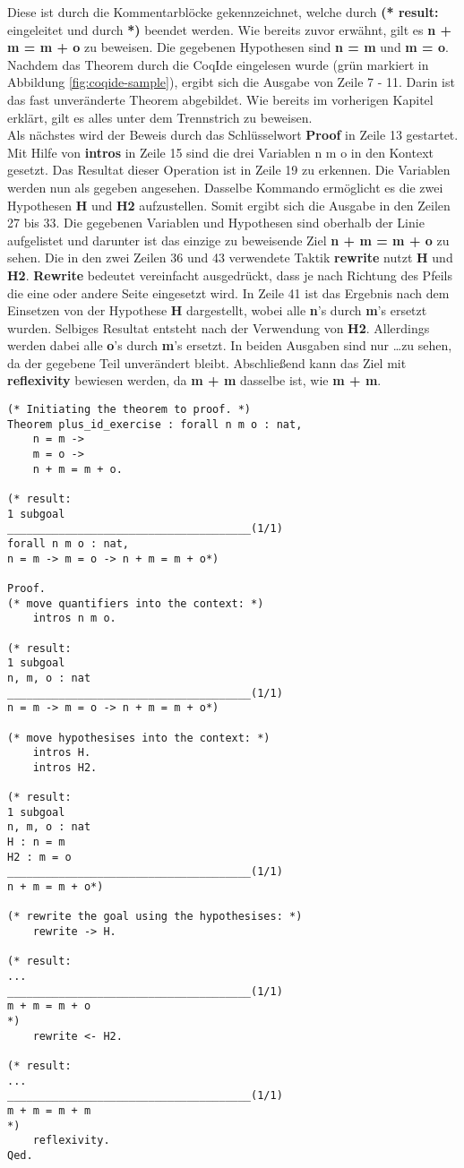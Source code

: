Diese ist durch die Kommentarblöcke gekennzeichnet, welche durch \textbf{(* result:} eingeleitet und durch \textbf{*)} beendet werden.
Wie bereits zuvor erwähnt, gilt es \textbf{n + m = m + o} zu beweisen. Die gegebenen Hypothesen sind \textbf{n = m} und \textbf{m = o}. Nachdem das Theorem durch die CoqIde eingelesen wurde (grün markiert in Abbildung \ref{fig:coqide-sample}), ergibt sich die Ausgabe von Zeile 7 - 11. Darin ist das fast unveränderte Theorem abgebildet. Wie bereits im vorherigen Kapitel erklärt, gilt es alles unter dem Trennstrich zu beweisen.\\
Als nächstes wird der Beweis durch das Schlüsselwort \textbf{Proof} in Zeile 13 gestartet. Mit Hilfe von \textbf{intros} in Zeile 15 sind die drei Variablen n m o in den Kontext gesetzt. Das Resultat dieser Operation ist in Zeile 19 zu erkennen. Die Variablen werden nun als gegeben angesehen. Dasselbe Kommando ermöglicht es die zwei Hypothesen \textbf{H} und \textbf{H2} aufzustellen. Somit ergibt sich die Ausgabe in den Zeilen 27 bis 33. Die gegebenen Variablen und Hypothesen sind oberhalb der Linie aufgelistet und darunter ist das einzige zu beweisende Ziel \textbf{n + m = m + o} zu sehen. Die in den zwei Zeilen 36 und 43 verwendete Taktik \textbf{rewrite} nutzt \textbf{H} und \textbf{H2}.
\textbf{Rewrite} bedeutet vereinfacht ausgedrückt, dass je nach Richtung des Pfeils die eine oder andere Seite eingesetzt wird. In Zeile 41 ist das Ergebnis nach dem Einsetzen von der Hypothese \textbf{H} dargestellt, wobei alle \textbf{n}'s durch \textbf{m}'s ersetzt wurden. Selbiges Resultat entsteht nach der Verwendung von \textbf{H2}. Allerdings werden dabei alle \textbf{o}'s durch \textbf{m}'s ersetzt. In beiden Ausgaben sind nur \dots zu sehen, da der gegebene Teil unverändert bleibt.
Abschließend kann das Ziel mit \textbf{reflexivity} bewiesen werden, da \textbf{m + m} dasselbe ist, wie \textbf{m + m}.

\begin{lstlisting}[language=coq,firstnumber=1,caption=Coq Beispielbeweis,label=lst:sample-proof2]
(* Initiating the theorem to proof. *)
Theorem plus_id_exercise : forall n m o : nat,
	n = m ->
	m = o ->
	n + m = m + o.
	
(* result: 
1 subgoal
______________________________________(1/1)
forall n m o : nat,
n = m -> m = o -> n + m = m + o*)

Proof.
(* move quantifiers into the context: *)
	intros n m o. 
	
(* result: 
1 subgoal
n, m, o : nat
______________________________________(1/1)
n = m -> m = o -> n + m = m + o*)

(* move hypothesises into the context: *)	
	intros H.
	intros H2.

(* result: 
1 subgoal
n, m, o : nat
H : n = m
H2 : m = o
______________________________________(1/1)
n + m = m + o*)

(* rewrite the goal using the hypothesises: *)
	rewrite -> H.

(* result: 
...
______________________________________(1/1)
m + m = m + o
*)
	rewrite <- H2.

(* result:
...
______________________________________(1/1)
m + m = m + m
*)
	reflexivity.
Qed.
\end{lstlisting}

